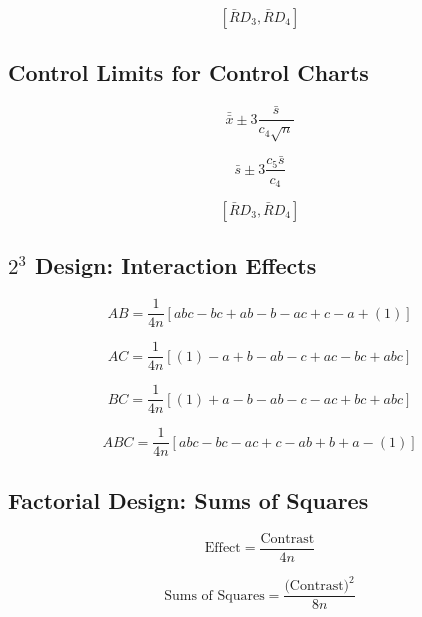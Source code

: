 \documentclass[a4paper,12pt]{article}
\begin{document}
\[\left[ \bar{R}D_3, \bar{R}D_4\right]\]

\subsection*{Control Limits for Control Charts}

\begin{multicols}{2}
	
\[ \bar{\bar{x}} \pm 3\frac{\bar{s}}{c_4\sqrt{n}}\]

\[ \bar{s} \pm 3\frac{c_5\bar{s}}{c_4}\]

\[\left[ \bar{R}D_3, \bar{R}D_4\right]\]
\end{multicols}
\subsection*{$2^3$ Design: Interaction Effects}

\[ AB = \frac{1}{4n} \left[ abc - bc + ab - b - ac + c - a + (1) \right] \]

\[ AC = \frac{1}{4n} \left[ (1) - a + b - ab -c + ac - bc + abc \right] \]

\[ BC = \frac{1}{4n} \left[ (1) + a - b - ab - c - ac + bc + abc \right] \]

\[ABC = \frac{1}{4n} \left[ abc - bc - ac + c - ab + b +  a - (1) \right] \]

\bigskip


\subsection*{Factorial Design: Sums of Squares}

\[\mbox{Effect} =  \frac{\mbox{Contrast}}{4n}\]

\[\mbox{Sums of Squares} =  \frac{\mbox{(Contrast)}^2}{8n}\]
\end{document}
